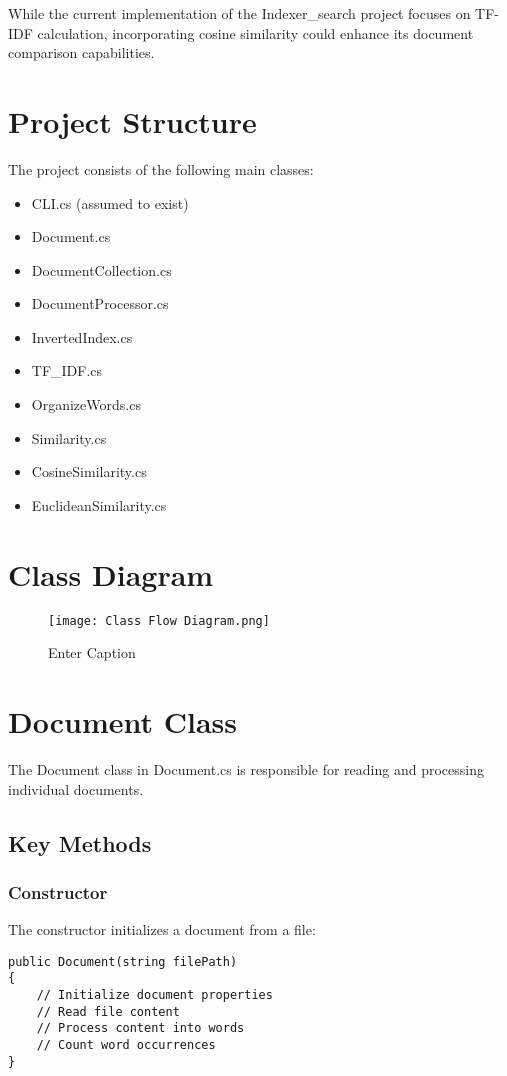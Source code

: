 \documentclass{article}
\begin{document}
While the current implementation of the Indexer\_search project focuses on TF-IDF calculation, incorporating cosine similarity could enhance its document comparison capabilities.

\section{Project Structure}
The project consists of the following main classes:
\begin{itemize}
    \item CLI.cs (assumed to exist)
    \item Document.cs
    \item DocumentCollection.cs
    \item DocumentProcessor.cs
    \item InvertedIndex.cs
    \item TF\_IDF.cs
    \item OrganizeWords.cs
    \item Similarity.cs
    \item CosineSimilarity.cs
    \item EuclideanSimilarity.cs
\end{itemize}

\section{Class Diagram}
\begin{figure}[h]
    \centering
    \texttt{[image: Class Flow Diagram.png]}
    \caption{Enter Caption}
    \label{fig:enter-label}
\end{figure}

\section{Document Class}
The Document class in Document.cs is responsible for reading and processing individual documents.

\subsection{Key Methods}
\subsubsection{Constructor}
The constructor initializes a document from a file:

\begin{lstlisting}
public Document(string filePath)
{
    // Initialize document properties
    // Read file content
    // Process content into words
    // Count word occurrences
}
\end{lstlisting}
\end{document}
